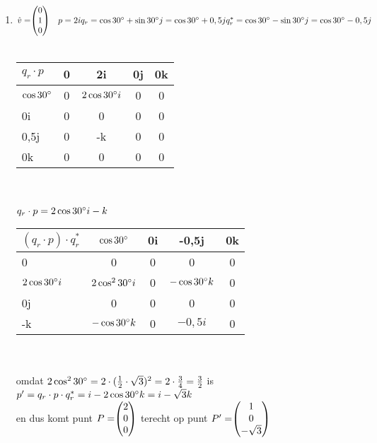 \begin{enumerate}
	\item 
	$\hat{v} = \vecdrie{0}{1}{0}
	\quad p  = 2i   \\
	q_r  =  \cos 30 \degree  + \sin 30 \degree j  =  \cos 30 \degree  + 0,5j \\
	q^*_r  =  \cos 30 \degree  - \sin 30 \degree j  =  \cos 30 \degree  - 0,5j $ \\ \\
	\begin{tabular}{ | l || c | c |c |c |}
		\hline
		$ q_r\cdot p $ & 0 & 2i  & 0j       & 0k \\ \hline \hline
		$\cos 30 \degree $   & 0 & $ 2\cos 30 \degree i  $ &   0    & 0  \\ \hline
		0i         & 0 & 0   &   0    & 0 \\ \hline
		0,5j         & 0 &  -k  &   0     & 0\\ \hline
		0k         & 0  & 0 & 0      & 0 \\ 
		\hline 
	\end{tabular} \\ \\
	$ q_r\cdot p = 2\cos 30 \degree i - k$\\
	
	\begin{tabular}{ | l || c | c |c |c |}
		\hline
		$ (q_r\cdot p)\cdot q^*_r $ & $\cos 30 \degree $  & 0i  & -0,5j   & 0k \\ \hline \hline
		0  & 0 & 0 &   0    & 0  \\ \hline
		$ 2\cos 30 \degree i  $   & $ 2\cos^2 30 \degree i  $ & 0   
		&   $ - \cos 30 	\degree k $    & 0 \\ \hline
		0j         & 0 &  0  &   0     & 0\\ \hline
		-k         &  $ - \cos 30 	\degree k $     & 0 & $-0,5i$      & 0 \\ 
		\hline 
	\end{tabular} \\ \\
	omdat  $ 2\cos^2 30 \degree   =  2\cdot (\frac{1}{2}\cdot \sqrt{3})^2 = 2\cdot \frac{3}{4} = \frac{3}{2}$ is \\
	$ p' = q_r\cdot p\cdot q^*_r  = i - 2\cos 30 \degree  k = i - \sqrt{3}k $ \\
	en dus komt  punt $ P= \vecdrie{2}{0}{0} $  terecht op punt $ P'= \vecdrie{1}{0}{-\sqrt{3}} $ 
	
\end{enumerate}

